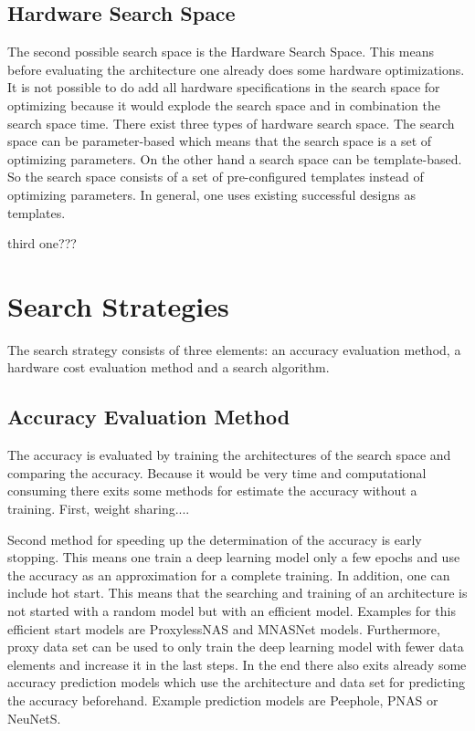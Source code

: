 \documentclass[conference]{IEEEtran}
\begin{document}
\subsection{Hardware Search Space}

The second possible search space is the Hardware Search Space. This means before evaluating the architecture one already does some hardware optimizations. It is not possible to do add all hardware specifications in the search space for optimizing because it would explode the search space and in combination the search space time. There exist three types of hardware search space. The search space can be parameter-based which means that the search space is a set of optimizing parameters. On the other hand a search space can be template-based. So the search space consists of a set of pre-configured templates instead of optimizing parameters. In general, one uses existing successful designs as templates.

third one???

\section{Search Strategies}

The search strategy consists of three elements: an accuracy evaluation method, a hardware cost evaluation method and a search algorithm. 

\subsection{Accuracy Evaluation Method}
The accuracy is evaluated by training the architectures of the search space and comparing the accuracy. Because it would be very time and computational consuming there exits some methods for estimate the accuracy without a training. First, weight sharing....

Second method for speeding up the determination of the accuracy is early stopping. This means one train a deep learning model only a few epochs and use the accuracy as an approximation for a complete training. In addition, one can include hot start. This means that the searching and training of an architecture is not started with a random model but with an efficient model. Examples for this efficient start models are ProxylessNAS and MNASNet models. Furthermore, proxy data set can be used to only train the deep learning model with fewer data elements and increase it in the last steps. In the end there also exits already some accuracy prediction models which use the architecture and data set for predicting the accuracy beforehand. Example prediction models are Peephole, PNAS or NeuNetS. 
\end{document}
